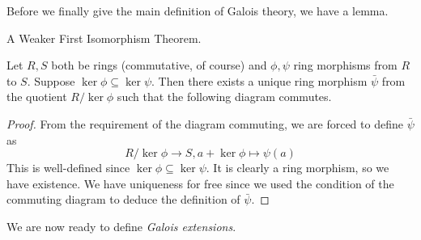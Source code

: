 \documentclass[../book.tex]{subfiles}
\begin{document}
Before we finally give the main definition of Galois theory,
we have a lemma. 

\begin{lem} A Weaker First Isomorphism Theorem. 
    
    Let $R, S$ both be rings (commutative, of course) and
    $\phi, \psi$ ring morphisms from $R$ to $S$. 
    Suppose $\ker \phi \subseteq \ker \psi$. 
    Then there exists a unique ring morphism $\bar{\psi}$
    from the quotient $R/\ker \phi$ such that the following diagram commutes.
    \begin{figure}[H]
        \centering
    \end{figure}
\end{lem}
\begin{proof}
    From the requirement of the diagram commuting, 
    we are forced to define $\bar{\psi}$ as \[
      R/\ker\phi \to S , a + \ker\phi \mapsto \psi(a)  
    \]
    This is well-defined since $\ker\phi \subseteq \ker\psi$. 
    It is clearly a ring morphism, so we have existence. 
    We have uniqueness for free since
    we used the condition of the commuting diagram 
    to deduce the definition of $\bar{\psi}$. 
\end{proof}

We are now ready to define \emph{Galois extensions}. 
\end{document}
